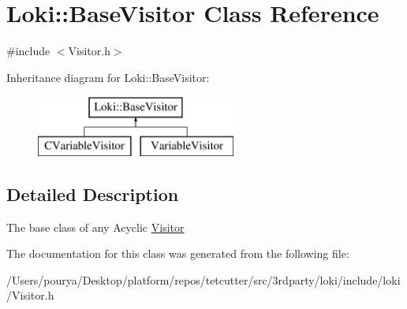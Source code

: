 \hypertarget{classLoki_1_1BaseVisitor}{}\section{Loki\+:\+:Base\+Visitor Class Reference}
\label{classLoki_1_1BaseVisitor}


{\ttfamily \#include $<$Visitor.\+h$>$}

Inheritance diagram for Loki\+:\+:Base\+Visitor\+:\begin{figure}[H]
\begin{center}
\leavevmode
\includegraphics[height=2.000000cm]{classLoki_1_1BaseVisitor}
\end{center}
\end{figure}


\subsection{Detailed Description}
The base class of any Acyclic \hyperlink{classLoki_1_1Visitor}{Visitor} 

The documentation for this class was generated from the following file\+:\begin{DoxyCompactItemize}
\item 
/\+Users/pourya/\+Desktop/platform/repos/tetcutter/src/3rdparty/loki/include/loki/Visitor.\+h\end{DoxyCompactItemize}

